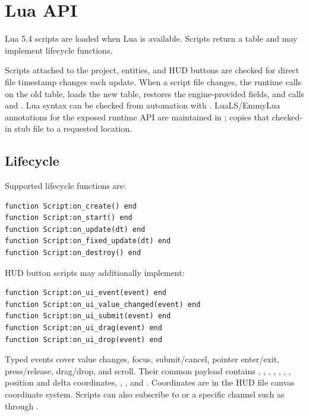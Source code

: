 \chapter{Lua API}

Lua 5.4 scripts are loaded when Lua is available. Scripts return a table and may implement lifecycle functions.

Scripts attached to the project, entities, and HUD buttons are checked for direct file timestamp changes each update. When a script file changes, the runtime calls  on the old table, loads the new table, restores the engine-provided fields, and calls  and . Lua syntax can be checked from automation with . LuaLS/EmmyLua annotations for the exposed runtime API are maintained in ;  copies that checked-in stub file to a requested location.

\section{Lifecycle}

Supported lifecycle functions are:

\begin{lstlisting}[language={[5.2]Lua}]
function Script:on_create() end
function Script:on_start() end
function Script:on_update(dt) end
function Script:on_fixed_update(dt) end
function Script:on_destroy() end
\end{lstlisting}

HUD button scripts may additionally implement:

\begin{lstlisting}[language={[5.2]Lua}]
function Script:on_ui_event(event) end
function Script:on_ui_value_changed(event) end
function Script:on_ui_submit(event) end
function Script:on_ui_drag(event) end
function Script:on_ui_drop(event) end
\end{lstlisting}

Typed events cover value changes, focus, submit/cancel, pointer enter/exit,
press/release, drag/drop, and scroll.
Their common payload contains , , ,
, , , , position and
delta coordinates, , , and .
Coordinates are in the HUD file canvas coordinate system. Scripts can also
subscribe to  or a specific channel such as
 through .

